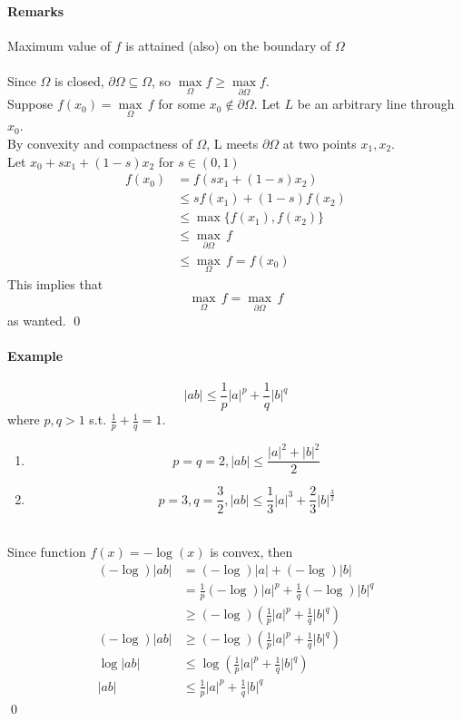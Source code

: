\documentclass[11pt]{article}
\begin{document}
\paragraph{Remarks}
Maximum value of $f$ is attained (also) on the boundary of $\Omega$ \\
 \\
Since $\Omega$ is closed, $\partial \Omega \subseteq \Omega$, so $\underset{\Omega}{\max} f \geq \underset{\partial \Omega}{\max} f$.\\
Suppose $f(x_0) = \underset{\Omega}{\max} \, f$ for some $x_0 \notin \partial \Omega$.
Let $L$ be an arbitrary line through $x_0$. \\
By convexity and compactness of $\Omega$, L meets $\partial \Omega$ at two points $x_1, x_2$. 
\\
Let $x_0 + sx_1 + (1-s)x_2$ for $ s\in (0,1)$
\begin{align*}
	f(x_0) &= f(sx_1 + (1-s)x_2) \\
	&\leq sf(x_1) + (1-s)f(x_2) \tag{$f$ convex}\\
	&\leq \max\{f(x_1), f(x_2)\} \\
	&\leq \underset{\partial \Omega}{\max} \, f\\
	&\leq \underset{\Omega}{\max} \, f = f(x_0) 
\end{align*}
This implies that $$\underset{\Omega}{\max} \, f = \underset{\partial \Omega}{\max} \, f$$
as wanted.
\qed

\paragraph{Example}
$$|ab| \leq \frac{1}{p}|a|^p + \frac{1}{q}|b|^q$$
where $p,q > 1$ s.t. $\frac{1}{p} + \frac{1}{q} = 1$.\\
\begin{enumerate}
	\item $$p=q=2, |ab| \leq \frac{|a|^2 + |b|^2}{2}$$ 
	\item 
	$$p=3, q=\frac{3}{2}, |ab| \leq \frac{1}{3}|a|^3 + \frac{2}{3}|b|^{\frac{3}{2}}$$
\end{enumerate}
 \\
Since function $f(x) = -\log (x)$ is convex, then
\begin{align*}
	(-\log)|ab| &= (-\log)|a| + (-\log)|b| \\
	&= \frac{1}{p}(-\log)|a|^p + \frac{1}{q}(-\log)|b|^q \\
	&\geq (-\log)(\frac{1}{p}|a|^p + \frac{1}{q}|b|^q)\\
	(-\log)|ab| &\geq (-\log)(\frac{1}{p}|a|^p + \frac{1}{q}|b|^q) \\
	\log|ab| &\leq \log(\frac{1}{p}|a|^p + \frac{1}{q}|b|^q) \\
	|ab| &\leq \frac{1}{p}|a|^p + \frac{1}{q}|b|^q \tag{exponential function is increasing}
\end{align*}
\qed 
\end{document}
